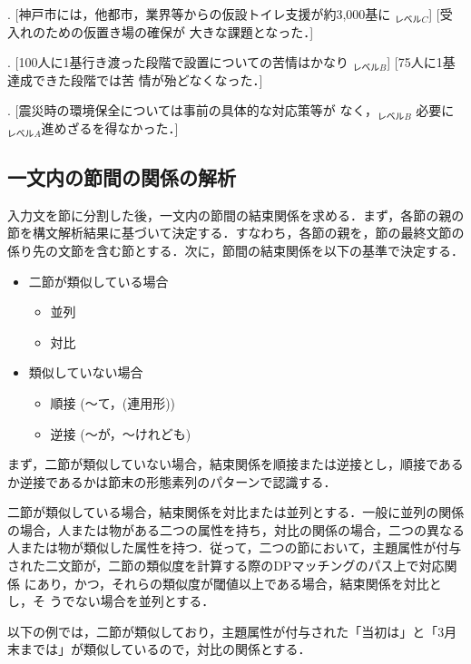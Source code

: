  \ex. [神戸市には，他都市，業界等からの仮設トイレ支援が約3,000基に 
  $_{レベルC}$] [受入れのための仮置き場の確保が
 大きな課題となった．]\label{ex:koube-level}

\ex. [100人に1基行き渡った段階で設置についての苦情はかなり
$_{レベルB}$]  [75人に1基達成できた段階では苦
情が殆どなくなった．]\label{ex:hyakunin-level}

\ex. [震災時の環境保全については事前の具体的な対応策等が\Underline
{なく，}$_{レベルB}$ 必要に$_{レベルA}$進めざるを得なかった．]\label{ex:shinsai-level}

\subsection{一文内の節間の関係の解析}
\label{subsec:dpnd_in_s}

入力文を節に分割した後，一文内の節間の結束関係を求める．まず，各節の親の
節を構文解析結果に基づいて決定する．すなわち，各節の親を，節の最終文節の
係り先の文節を含む節とする．次に，節間の結束関係を以下の基準で決定する．

\begin{itemize}
 \item 二節が類似している場合
 \begin{itemize}
  \item 並列
  \item 対比
 \end{itemize}
 \item 類似していない場合
  \begin{itemize} 
   \item 順接 (〜て，(連用形))
   \item 逆接 (〜が，〜けれども)
  \end{itemize}
\end{itemize}

まず，二節が類似していない場合，結束関係を順接または逆接とし，順接である
か逆接であるかは節末の形態素列のパターンで認識する．

二節が類似している場合，結束関係を対比または並列とする．一般に並列の関係
の場合，人または物がある二つの属性を持ち，対比の関係の場合，二つの異なる
人または物が類似した属性を持つ．従って，二つの節において，主題属性が付与
された二文節が，二節の類似度を計算する際のDPマッチングのパス上で対応関係
にあり，かつ，それらの類似度が閾値以上である場合，結束関係を対比とし，そ
うでない場合を並列とする．

以下の例では，二節が類似しており，主題属性が付与された「当初は」と「3月
末までは」が類似しているので，対比の関係とする．

